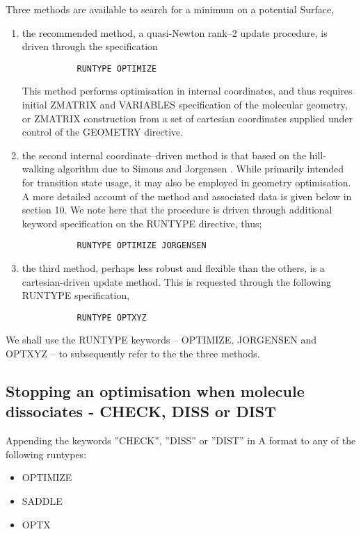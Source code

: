 \documentclass[11pt,fleqn]{article}
\begin{document}
Three methods are available to search for a minimum on
a potential Surface,
\begin{enumerate}
\item the recommended method, a quasi-Newton rank--2 update procedure,
is driven through the specification

{
\footnotesize
\begin{verbatim}
           RUNTYPE OPTIMIZE
\end{verbatim}
}
This method performs optimisation in internal coordinates, 
and thus requires initial ZMATRIX and VARIABLES specification of the 
molecular geometry, or ZMATRIX construction from a  set
of cartesian coordinates supplied under control of the
GEOMETRY directive.
\item the second internal coordinate--driven method is that 
based on the hill-walking algorithm due to 
Simons and Jorgensen  \cite{simons}. 
While primarily intended for transition state usage, it may also
be employed in geometry optimisation. A more detailed account of
the method and associated data is given below in section 10. We note
here that the procedure is driven through additional keyword
specification on the RUNTYPE directive, thus;

{
\footnotesize
\begin{verbatim}
           RUNTYPE OPTIMIZE JORGENSEN
\end{verbatim}
}
\item the third method, perhaps less robust and flexible than the
others, is a cartesian-driven update method. This is requested
through the following RUNTYPE specification,

{
\footnotesize
\begin{verbatim}
           RUNTYPE OPTXYZ
\end{verbatim}
}
\end{enumerate}
We shall use the RUNTYPE keywords -- OPTIMIZE, JORGENSEN and 
OPTXYZ -- to subsequently refer to the
the three methods. 

\subsection{Stopping an optimisation when molecule dissociates - CHECK, DISS or DIST}
Appending the keywords ''CHECK'', ''DISS'' or ''DIST'' in A format to
any of the following runtypes:

\begin{itemize}
\item OPTIMIZE
\item SADDLE
\item OPTX
\end{itemize}
\end{document}
